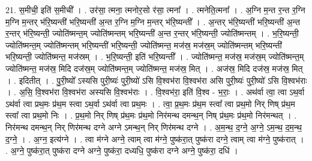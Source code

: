 \documentclass[17pt]{extarticle}
\begin{document}
21. स॒मीची॒ इति॑ स॒मीची᳚ । . उर॑सा॒ त्मना॒ त्मनोर॒सो र॑सा॒ त्मना᳚ । . त्मनेति॒त्मना᳚ । . अ॒ग्नि म॒न्त र॒न्त र॒ग्नि म॒ग्नि म॒न्तर् भ॑रि॒ष्यन्ती॑ भरि॒ष्यन्ती॑ अ॒न्त र॒ग्नि म॒ग्नि म॒न्तर् भ॑रि॒ष्यन्ती᳚ । . अ॒न्तर् भ॑रि॒ष्यन्ती॑ भरि॒ष्यन्ती॑ अ॒न्त र॒न्तर् भ॑रि॒ष्यन्ती॒ ज्योति॑ष्मन्त॒म् ज्योति॑ष्मन्तम् भरि॒ष्यन्ती॑ अ॒न्त र॒न्तर् भ॑रि॒ष्यन्ती॒ ज्योति॑ष्मन्तम् । . भ॒रि॒ष्यन्ती॒ ज्योति॑ष्मन्त॒म् ज्योति॑ष्मन्तम् भरि॒ष्यन्ती॑ भरि॒ष्यन्ती॒ ज्योति॑ष्मन्त॒ मज॑स्र॒ मज॑स्र॒म् ज्योति॑ष्मन्तम् भरि॒ष्यन्ती॑ भरि॒ष्यन्ती॒ ज्योति॑ष्मन्त॒ मज॑स्रम् । . भ॒रि॒ष्यन्ती॒ इति॑ भरि॒ष्यन्ती᳚ । . ज्योति॑ष्मन्त॒ मज॑स्र॒ मज॑स्र॒म् ज्योति॑ष्मन्त॒म् ज्योति॑ष्मन्त॒ मज॑स्र॒ मिदि दज॑स्र॒म् ज्योति॑ष्मन्त॒म् ज्योति॑ष्मन्त॒ मज॑स्र॒ मित् । . अज॑स्र॒ मिदि दज॑स्र॒ मज॑स्र॒ मित् । . इदितीत् । . पु॒री॒ष्यो᳚ ऽस्यसि पुरी॒ष्यः॑ पुरी॒ष्यो॑ ऽसि वि॒श्वभ॑रा वि॒श्वभ॑रा असि पुरी॒ष्यः॑ पुरी॒ष्यो॑ ऽसि वि॒श्वभ॑राः । . अ॒सि॒ वि॒श्वभ॑रा वि॒श्वभ॑रा अस्यसि वि॒श्वभ॑राः । . वि॒श्वभ॑रा॒ इति॑ वि॒श्व - भ॒राः॒ । . अथ॑र्वा त्वा॒ त्वा ऽथ॒र्वा ऽथ॑र्वा त्वा प्रथ॒मः प्र॑थ॒म स्त्वा ऽथ॒र्वा ऽथ॑र्वा त्वा प्रथ॒मः । . त्वा॒ प्र॒थ॒मः प्र॑थ॒म स्त्वा᳚ त्वा प्रथ॒मो निर् णिष् प्र॑थ॒म स्त्वा᳚ त्वा प्रथ॒मो निः । . प्र॒थ॒मो निर् णिष् प्र॑थ॒मः प्र॑थ॒मो निर॑मन्थ दमन्थ॒न् निष् प्र॑थ॒मः प्र॑थ॒मो निर॑मन्थत् । . निर॑मन्थ दमन्थ॒न् निर् णिर॑मन्थ दग्ने अग्ने ऽमन्थ॒न् निर् णिर॑मन्थ दग्ने । . अ॒म॒न्थ॒ द॒ग्ने॒ अ॒ग्ने॒ ऽम॒न्थ॒ द॒म॒न्थ॒ द॒ग्ने॒ । . अ॒ग्न॒ इत्य॑ग्ने । . त्वा म॑ग्ने अग्ने॒ त्वाम् त्वा म॑ग्ने॒ पुष्क॑रा॒त् पुष्क॑रा दग्ने॒ त्वाम् त्वा म॑ग्ने॒ पुष्क॑रात् । . अ॒ग्ने॒ पुष्क॑रा॒त् पुष्क॑रा दग्ने अग्ने॒ पुष्क॑रा॒ दध्यधि॒ पुष्क॑रा दग्ने अग्ने॒ पुष्क॑रा॒ दधि॑ । \newline
\end{document}
